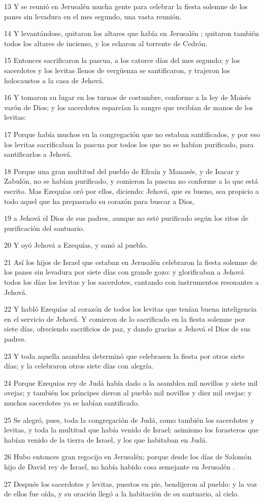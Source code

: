 \par 13 Y se reunió en Jerusalén  mucha gente para celebrar la fiesta solemne de los panes sin levadura en el mes segundo, una vasta reunión.
\par 14 Y levantándose, quitaron los altares que había en Jerusalén ; quitaron también todos los altares de incienso, y los echaron al torrente de Cedrón.
\par 15 Entonces sacrificaron la pascua, a los catorce días del mes segundo; y los sacerdotes y los levitas llenos de vergüenza se santificaron, y trajeron los holocaustos a la casa de Jehová.
\par 16 Y tomaron su lugar en los turnos de costumbre, conforme a la ley de Moisés varón de Dios; y los sacerdotes esparcían la sangre que recibían de manos de los levitas:
\par 17 Porque había muchos en la congregación que no estaban santificados, y por eso los levitas sacrificaban la pascua por todos los que no se habían purificado, para santificarlos a Jehová.
\par 18 Porque una gran multitud del pueblo de Efraín y Manasés, y de Isacar y Zabulón, no se habían purificado, y comieron la pascua no conforme a lo que está escrito. Mas Ezequías oró por ellos, diciendo: Jehová, que es bueno, sea propicio a todo aquel que ha prepasrado su corazón para buscar a Dios,
\par 19 a Jehová el Dios de sus padres, aunque no esté purificado según los ritos de  purificación del santuario.
\par 20 Y oyó Jehová a Ezequías, y sanó al pueblo.
\par 21 Así los hijos de Israel que estaban en Jerusalén celebraron la fiesta solemne de los panes sin levadura por siete días con grande gozo: y glorificaban a Jehová todos los días los levitas y los sacerdotes, cantando con instrumentos resonantes a Jehová.
\par 22 Y habló Ezequías al corazón de todos los levitas que tenían buena inteligencia en el servicio de Jehová. Y comieron de lo sacrificado en la fiesta solemne por siete días, ofreciendo sacrificios de paz, y dando gracias a Jehová el Dios de sus padres.
\par 23 Y toda aquella asamblea determinó que celebrasen la fiesta por otros siete días; y la celebraron otros siete días con alegría.
\par 24 Porque Ezequías rey de Judá había dado a la asamblea mil novillos y siete mil ovejas; y también los príncipes dieron al pueblo mil novillos y diez mil ovejas: y muchos sacerdotes ya se habían santificado.
\par 25 Se alegró, pues, toda la congregación de Judá, como también los sacerdotes y levitas, y toda la multitud que había venido de Israel; asimismo los forasteros que habían venido de la tierra de Israel, y los que habitaban en Judá.
\par 26 Hubo entonces gran regocijo en Jerusalén; porque desde los días de Salomón hijo de David rey de Israel, no había habido cosa semejante en Jerusalén .
\par 27 Después los sacerdotes y levitas, puestos en pie, bendijeron al pueblo: y la voz de ellos fue oída, y su oración llegó a la habitación de su santuario, al cielo.


